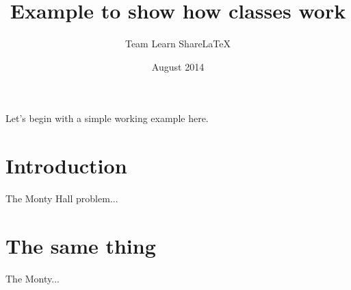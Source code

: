 \documentclass[red]{eqconf}
\title{Example to show how classes work}
\author{Team Learn ShareLaTeX}
\date{August 2014}
\begin{document}
 
\maketitle
 
\noindent
Let's begin with a simple working example here.
 
\blindtext
 
\section{Introduction}
 
The Monty Hall problem...
 
\section{The same thing}
 
The Monty...
\end{document}
